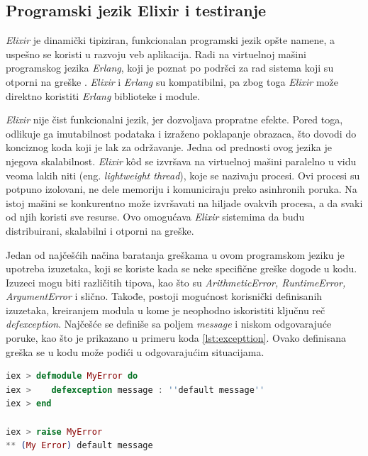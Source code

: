 \documentclass[12pt,oneside]{memoir}
\begin{document}
\subsection{Programski jezik Elixir i testiranje}
\par \emph{Elixir} je dinamički tipiziran, funkcionalan programski jezik opšte namene, a uspešno se koristi u razvoju veb aplikacija. Radi na virtuelnoj mašini programskog jezika \emph{Erlang}, koji je poznat po podršci za rad sistema koji su otporni na greške \cite{elixir-lang-official, erlang}. \emph{Elixir} i \emph{Erlang} su kompatibilni, pa zbog toga \emph{Elixir} može direktno koristiti \emph{Erlang} biblioteke i module. 
\par \emph{Elixir} nije čist funkcionalni jezik, jer dozvoljava propratne efekte. Pored toga, odlikuje ga imutabilnost podataka i izraženo poklapanje obrazaca, što dovodi do konciznog koda koji je lak za održavanje. Jedna od prednosti ovog jezika je njegova skalabilnost. \emph{Elixir} k\^{o}d se izvršava na virtuelnoj mašini paralelno u vidu veoma lakih niti (eng. \emph{lightweight thread}), koje se nazivaju procesi. Ovi procesi su potpuno izolovani, ne dele memoriju i komuniciraju preko asinhronih poruka. Na istoj mašini se konkurentno može izvršavati na hiljade ovakvih procesa, a da svaki od njih koristi sve resurse. Ovo omogućava \emph{Elixir} sistemima da budu distribuirani, skalabilni i otporni na greške. 
\par Jedan od najčešćih načina baratanja greškama u ovom programskom jeziku je upotreba izuzetaka, koji se koriste kada se neke specifične greške dogode u kodu. Izuzeci mogu biti različitih tipova, kao što su \emph{ArithmeticError, RuntimeError, ArgumentError} i slično. Takođe, postoji mogućnost korisnički definisanih izuzetaka, kreiranjem modula u kome je neophodno iskoristiti ključnu reč \emph{defexception}. Najčešće se definiše sa poljem \emph{message} i niskom odgovarajuće poruke, kao što je prikazano u primeru koda \ref{lst:excepttion}. Ovako definisana greška se u kodu može podići u odgovarajućim situacijama. \\

\begin{minipage}{\linewidth}
\begin{lstlisting}[language=elixir, basicstyle=\small, caption={Definicija izuzetka u programskom jeziku Elixir},captionpos=b, label={lst:excepttion}]
iex > defmodule MyError do 
iex > 	 defexception message : ''default message''
iex > end 

iex > raise MyError
** (My Error) default message
\end{lstlisting}
\end{minipage}
\end{document}
